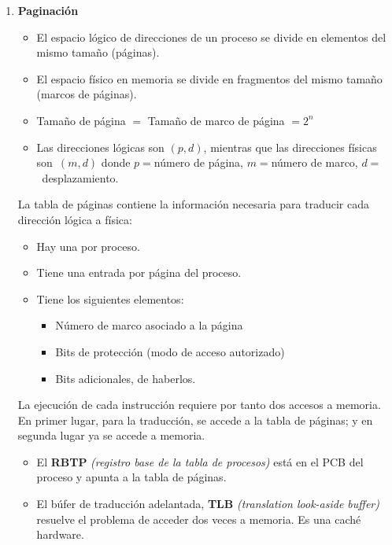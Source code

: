 \begin{enumerate}
    \item \textbf{Paginación}
    \begin{itemize}
        \item El espacio lógico de direcciones de un proceso se divide en elementos del mismo tamaño (páginas).
        \item El espacio físico en memoria se divide en fragmentos del mismo tamaño (marcos de páginas).
        \item Tamaño de página $=$ Tamaño de marco de página $=2^n$
        \item Las direcciones lógicas son $(p,d)$, mientras que las direcciones físicas son~$(m,d)$ donde $p=$número de página, $m=$número de marco, $d=$~desplazamiento.
    \end{itemize}

    La tabla de páginas contiene la información necesaria para traducir cada dirección lógica a física:
    \begin{itemize}
        \item Hay una por proceso.
        \item Tiene una entrada por página del proceso.
        \item Tiene los siguientes elementos:
        \begin{itemize}
            \item Número de marco asociado a la página
            \item Bits de protección (modo de acceso autorizado)
            \item Bits adicionales, de haberlos.
        \end{itemize}
    \end{itemize}

    La ejecución de cada instrucción requiere por tanto dos accesos a memoria. En primer lugar, para la traducción, se accede a la tabla de páginas; y en segunda lugar ya se accede a memoria.
    \begin{itemize}
        \item El \textbf{RBTP} \textit{(registro base de la tabla de procesos)} está en el PCB del proceso y apunta a la tabla de páginas.

        \item El búfer de traducción adelantada, \textbf{TLB} \textit{(translation look-aside buffer)} resuelve el problema de acceder dos veces a memoria. Es una caché hardware.
    \end{itemize}
    

\end{enumerate}
